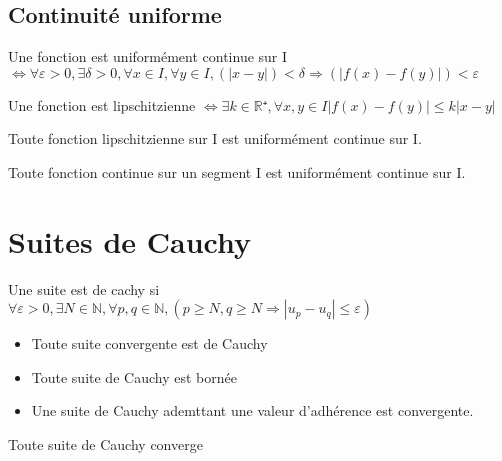 \documentclass[french]{yLectureNote}
\begin{document}
\subsection{Continuité uniforme}
\begin{definition}
Une fonction est uniformément continue sur I \(\iff \forall \varepsilon>0,\exists \delta >0, \forall x\in I, \forall y\in I, (|x-y|)<\delta \Rightarrow (|f(x)-f(y)|)<\varepsilon \)
\end{definition}
\begin{definition}
Une fonction  est lipschitzienne \(\iff \exists k\in\mathbb{R}⁺,\forall x,y\in I |f(x)-f(y)| \leq k|x-y|\)
\end{definition}
\begin{theorem}
 Toute fonction lipschitzienne sur I est uniformément continue sur I.
\end{theorem}
\begin{theorem}
 Toute fonction continue sur un segment I est uniformément continue sur I.
\end{theorem}
\section{Suites de Cauchy}
\begin{definition}
Une suite est de cachy si \(\forall \varepsilon>0,\exists N\in\mathbb{N},\forall p,q \in\mathbb{N}, (p\geq N,q\geq N \Rightarrow |u_p-u_q|\leq \varepsilon)\)
\end{definition}
\begin{proposition}
\begin{itemize}
 \item Toute suite convergente est de Cauchy
 \item Toute suite de Cauchy est bornée
 \item Une suite de Cauchy ademttant une valeur d'adhérence est convergente.
\end{itemize}
\begin{theorem}
 Toute suite de Cauchy converge
\end{theorem}
\end{proposition}
\end{document}
